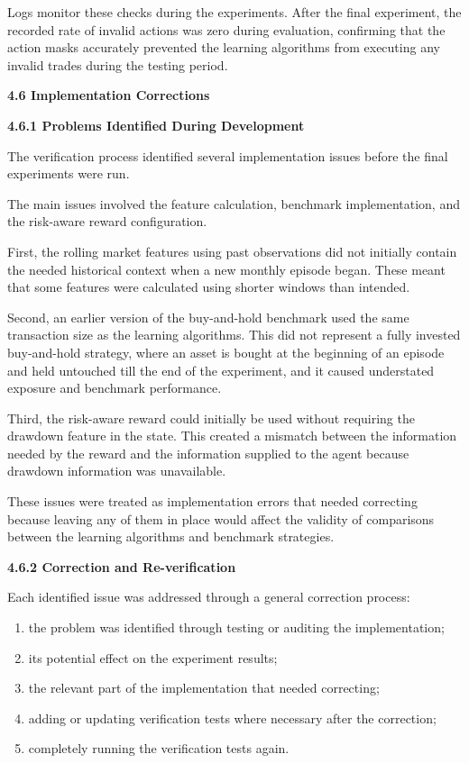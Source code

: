 Logs monitor these checks during the experiments. After the final
experiment, the recorded rate of invalid actions was zero during
evaluation, confirming that the action masks accurately prevented the
learning algorithms from executing any invalid trades during the testing
period.

\textbf{4.6 Implementation Corrections}

\textbf{4.6.1 Problems Identified During Development}

The verification process identified several implementation issues before
the final experiments were run.

The main issues involved the feature calculation, benchmark
implementation, and the risk-aware reward configuration.

First, the rolling market features using past observations did not
initially contain the needed historical context when a new monthly
episode began. These meant that some features were calculated using
shorter windows than intended.

Second, an earlier version of the buy-and-hold benchmark used the same
transaction size as the learning algorithms. This did not represent a
fully invested buy-and-hold strategy, where an asset is bought at the
beginning of an episode and held untouched till the end of the
experiment, and it caused understated exposure and benchmark
performance.

Third, the risk-aware reward could initially be used without requiring
the drawdown feature in the state. This created a mismatch between the
information needed by the reward and the information supplied to the
agent because drawdown information was unavailable.

These issues were treated as implementation errors that needed
correcting because leaving any of them in place would affect the
validity of comparisons between the learning algorithms and benchmark
strategies.

\textbf{4.6.2 Correction and Re-verification}

Each identified issue was addressed through a general correction
process:

\begin{enumerate}
\def\labelenumi{\arabic{enumi}.}
\item
  the problem was identified through testing or auditing the
  implementation;
\item
  its potential effect on the experiment results;
\item
  the relevant part of the implementation that needed correcting;
\item
  adding or updating verification tests where necessary after the
  correction;
\item
  completely running the verification tests again.
\end{enumerate}

